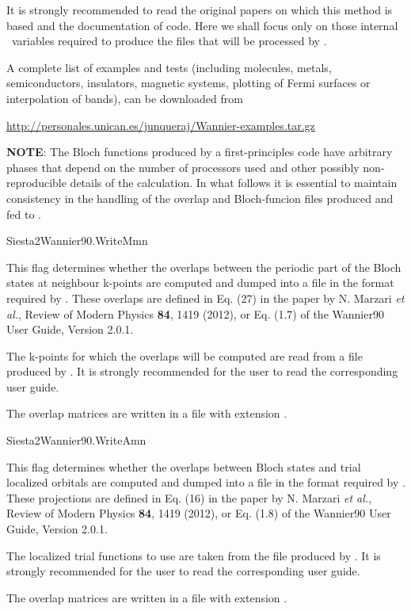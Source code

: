 It is strongly recommended to read the original papers on which this
method is based and the  documentation of  code.
Here we shall focus only on those internal \siesta\ variables
required to produce the files that will be processed
by .

A complete list of examples and tests (including molecules, metals, 
semiconductors, insulators, magnetic systems, plotting of Fermi surfaces
or interpolation of bands), can be downloaded from

 \url{http://personales.unican.es/junqueraj/Wannier-examples.tar.gz}

\textbf{NOTE}: The Bloch functions produced by a first-principles code
      have arbitrary phases that depend on the number of processors
      used and other possibly non-reproducible details of the
      calculation. In what follows it is essential to maintain
      consistency in the handling of the overlap and Bloch-funcion
      files produced and fed to .
%

\begin{fdflogicalF}{Siesta2Wannier90.WriteMmn}
        
  This flag determines whether the overlaps between the periodic part
  of the Bloch states at neighbour k-points are computed and dumped
  into a file in the format required by .  These
  overlaps are defined in Eq. (27) in the paper by N. Marzari
  \textit{et al.}, Review of Modern Physics \textbf{84}, 1419 (2012),
  or Eq. (1.7) of the Wannier90 User Guide, Version 2.0.1.

  The k-points for which the overlaps will be computed are read from a
   file produced by . It is strongly
  recommended for the user to read the corresponding user guide.

  The overlap matrices are written in a file with extension
  .

\end{fdflogicalF}

\begin{fdflogicalF}{Siesta2Wannier90.WriteAmn}
  
  This flag determines whether the overlaps between Bloch states and
  trial localized orbitals are computed and dumped into a file in the
  format required by .  These projections are
  defined in Eq. (16) in the paper by N. Marzari \textit{et al.},
  Review of Modern Physics \textbf{84}, 1419 (2012), or Eq. (1.8) of
  the Wannier90 User Guide, Version 2.0.1.

  The localized trial functions to use are taken from the
   file produced by . It is strongly
  recommended for the user to read the corresponding user guide.

  The overlap matrices are written in a file with extension
  .

\end{fdflogicalF}

